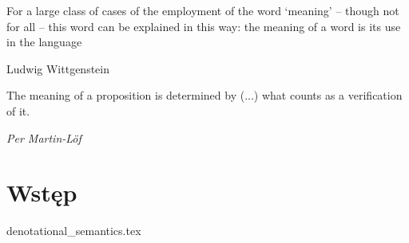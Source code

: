  
\epigraph{
For a large class of cases of the employment of the word ‘meaning’ -- though not for all -- this word can be explained in this way: the meaning of a word is its use in the language
}{\small{Ludwig Wittgenstein}}

\epigraph{The meaning of a proposition is determined by (...) what counts as a
verification of it. \cite{Lof_96}}{\small{\textit{Per Martin-Löf}}}


\section{Wstęp}
{denotational_semantics.tex}

